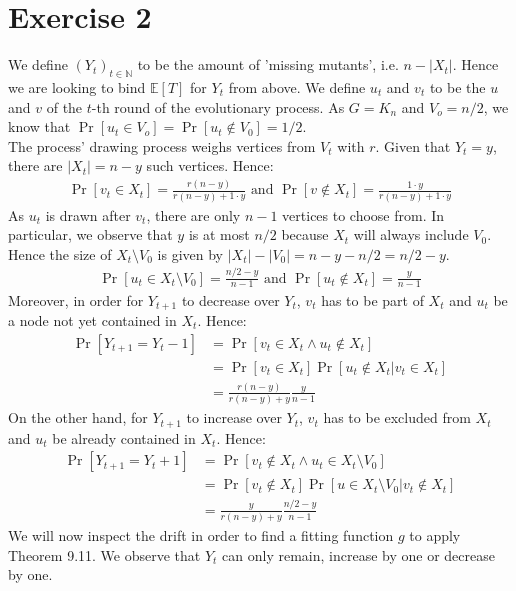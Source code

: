 \documentclass[a4paper,german]{article}
\newcommand{\E}{\mathbb{E}}
\begin{document}
\section*{Exercise 2}
We define \((Y_t)_{t \in \mathbb{N}}\) to be the amount of 'missing mutants', i.e. \(n - |X_t|\). Hence we are looking to bind \(\E[T]\) for \(Y_t\) from above. We define \(u_t\) and \(v_t\) to be the \(u\) and \(v\) of the \(t\)-th round of the evolutionary process. As \(G = K_n\) and \(V_o = n/2\), we know that \(\Pr[u_t \in V_o] = \Pr[u_t \notin V_0] = 1/2\). \\
The process' drawing process weighs vertices from \(V_t\) with \(r\). Given that \(Y_t = y\), there are \( |X_t| = n - y\) such vertices. Hence:
\begin{align*}
	\Pr[v_t \in X_t] = \frac{r(n-y)}{r(n-y) + 1 \cdot y} \text{ and } \Pr[v \notin X_t] = \frac{1 \cdot y}{r(n-y) + 1 \cdot y} 
\end{align*}
As \(u_t\) is drawn after \(v_t\), there are only \(n-1\) vertices to choose from. In particular, we observe that \(y\) is at most \(n/2\) because \(X_t\) will always include \(V_0\). Hence the size of \(X_t \setminus V_0\) is given by \(|X_t| - |V_0| = n - y - n/2 = n/2 - y\).
\begin{align*}
	\Pr[u_t \in X_t \setminus V_0] = \frac{n/2 - y}{n-1} \text{ and } \Pr[u_t \notin X_t] = \frac{y}{n-1}
\end{align*}
Moreover, in order for \(Y_{t+1}\) to decrease over \(Y_t\), \(v_t\) has to be part of \(X_t\) and \(u_t\) be a node not yet contained in \(X_t\). Hence:
\begin{align*}
	\Pr[Y_{t+1} = Y_t - 1] &= \Pr[v_t \in X_t \wedge u_t \notin X_t] \\
	&= \Pr[v_t \in X_t] \Pr[u_t \notin X_t | v_t \in X_t] \\
	&= \frac{r(n-y)}{r(n-y) + y} \frac{y}{n-1}
\end{align*}
On the other hand, for \(Y_{t+1}\) to increase over \(Y_t\),  \(v_t\) has to be excluded from \(X_t\) and \(u_t\) be already contained in \(X_t\). Hence:
\begin{align*}
	\Pr[Y_{t+1} = Y_t + 1] &= \Pr[v_t \notin X_t \wedge u_t \in X_t \setminus V_0] \\
	&= \Pr[v_t \notin X_t] \Pr[u \in X_t \setminus V_0 | v_t \notin X_t] \\
	&= \frac{y}{r(n-y) + y} \frac{n/2 - y}{n-1}
\end{align*}
We will now inspect the drift in order to find a fitting function \(g\) to apply Theorem 9.11. We observe that \(Y_t\) can only remain, increase by one or decrease by one.
\end{document}
